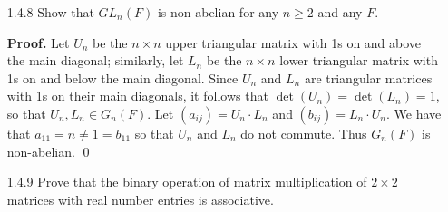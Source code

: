 \begin{enumerate}
      \textbf{Proof.} We shall the use following fact from Linear Algebra: a
      matrix with entries in a field is invertible if and only if its rows are
      linearly independent. So it suffices to count the number of matrices with
      independent rows. Since $|\F_p| = p$, it follows that there are $p^2$
      possible row vectors in $GL_2(\F_p)$. To form an invertible matrix, we cannot choose the
      zero vector, so there are $p^2 - 1$ choices for the first row.  Now two
      vectors are linearly independent if and only they are not a multiple of
      each other. Thus there are $p^2 - p$ for the second row. Thus 
      $|GL_2(\F_p)| = (p^2 - 1)(p^2 - p) = p^4 - p^3 - p^2 + p$. \qed
   \item[1.4.8]   Show that $GL_n(F)$ is non-abelian for any $n \ge 2$ and any
                  $F$.
                  
      \textbf{Proof.} Let $U_n$ be the $n \times n$ upper triangular matrix with
      1s on and above the main diagonal; similarly, let $L_n$ be the
      $n \times n$ lower triangular matrix with 1s on and below the main
      diagonal. Since $U_n$ and $L_n$ are triangular matrices with 1s on their
      main diagonals, it follows that $\det(U_n) = \det(L_n) = 1$, so that
      $U_n, L_n \in G_n(F)$. Let $(a_{ij}) = U_n \cdot L_n$ and
      $(b_{ij}) = L_n \cdot U_n$. We have that $a_{11} = n \neq 1 = b_{11}$ so
      that $U_n$ and $L_n$ do not commute. Thus $G_n(F)$ is non-abelian. \qed
   \item[1.4.9]   Prove that the binary operation of matrix multiplication of
                  $2 \times 2$ matrices with real number entries is associative.
                  

\end{enumerate}
